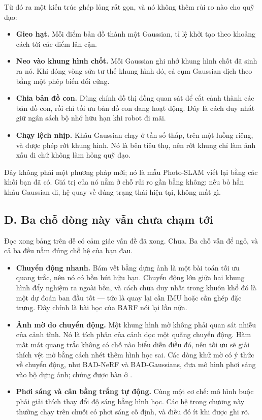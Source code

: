 \documentclass[../../deep_learning.tex]{subfiles}
\begin{document}
Từ đó ra một kiến trúc ghép lỏng rất gọn, và nó không thêm rủi ro nào cho quỹ đạo:

\begin{itemize}
\item \textbf{Gieo hạt.} Mỗi điểm bản đồ thành một Gaussian, tỉ lệ khởi tạo theo khoảng cách tới các điểm lân cận.
\item \textbf{Neo vào khung hình chốt.} Mỗi Gaussian ghi nhớ khung hình chốt đã sinh ra nó. Khi đóng vòng sửa tư thế khung hình đó, cả cụm Gaussian dịch theo bằng một phép biến đổi cứng.
\item \textbf{Chia bản đồ con.} Dùng chính đồ thị đồng quan sát để cắt cảnh thành các bản đồ con, rồi chỉ tối ưu bản đồ con đang hoạt động. Đây là cách duy nhất giữ ngân sách bộ nhớ hữu hạn khi robot đi mãi.
\item \textbf{Chạy lệch nhịp.} Khâu Gaussian chạy ở tần số thấp, trên một luồng riêng, và được phép rớt khung hình. Nó là bên tiêu thụ, nên rớt khung chỉ làm ảnh xấu đi chứ không làm hỏng quỹ đạo.
\end{itemize}

Đây không phải một phương pháp mới; nó là mẫu Photo-SLAM viết lại bằng các khối bạn đã có. Giá trị của nó nằm ở chỗ rủi ro gần bằng không: nếu bỏ hẳn khâu Gaussian đi, hệ quay về đúng trạng thái hiện tại, không mất gì.

\subsection{D. Ba chỗ dòng này vẫn chưa chạm tới}
Đọc xong bảng trên dễ có cảm giác vấn đề đã xong. Chưa. Ba chỗ vẫn để ngỏ, và cả ba đều nằm đúng chỗ hệ của bạn đau.

\begin{itemize}
\item \textbf{Chuyển động nhanh.} Bám vết bằng dựng ảnh là một bài toán tối ưu quang trắc, nên nó có bồn hút hữu hạn. Chuyển động lớn giữa hai khung hình đẩy nghiệm ra ngoài bồn, và cách chữa duy nhất trong khuôn khổ đó là một dự đoán ban đầu tốt --- tức là quay lại cần IMU hoặc cần ghép đặc trưng. Đây chính là bài học của BARF nói lại lần nữa.
\item \textbf{Ảnh mờ do chuyển động.} Một khung hình mờ không phải quan sát nhiễu của cảnh tĩnh. Nó là tích phân của cảnh dọc một quãng chuyển động. Hàm mất mát quang trắc không có chỗ nào biểu diễn điều đó, nên tối ưu sẽ giải thích vệt mờ bằng cách nhét thêm hình học sai. Các dòng khử mờ có ý thức về chuyển động, như BAD-NeRF và BAD-Gaussians, đưa mô hình phơi sáng vào bộ dựng ảnh; chúng được bàn ở .
\item \textbf{Phơi sáng và cân bằng trắng tự động.} Cùng một cơ chế: mô hình buộc phải giải thích thay đổi độ sáng bằng hình học. Các hệ trong chương này thường chạy trên chuỗi có phơi sáng cố định, và điều đó ít khi được ghi rõ.
\end{itemize}
\end{document}
